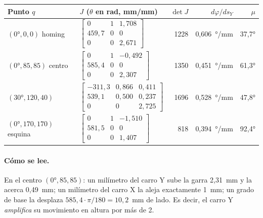 \begin{center}\small
\begin{longtable}{>{\raggedright}p{3cm} >{\centering}p{6.3cm} r r r}
\toprule
\textbf{Punto $q$} & \textbf{$J$ ($\theta$ en rad, mm/mm)} & \textbf{$\det J$} & \textbf{$d\varphi/ds_Y$} & \textbf{$\mu$}\\
\midrule
\endhead
$(0°, 0, 0)$ homing & $\begin{bmatrix}0 & 1 & 1{,}708\\ 459{,}7 & 0 & 0\\ 0 & 0 & 2{,}671\end{bmatrix}$ & 1228 & 0,606~°/mm & 37,7°\\[14pt]
$(0°, 85, 85)$ centro & $\begin{bmatrix}0 & 1 & -0{,}492\\ 585{,}4 & 0 & 0\\ 0 & 0 & 2{,}307\end{bmatrix}$ & 1350 & 0,451~°/mm & 61,3°\\[14pt]
$(30°, 120, 40)$ & $\begin{bmatrix}-311{,}3 & 0{,}866 & 0{,}411\\ 539{,}1 & 0{,}500 & 0{,}237\\ 0 & 0 & 2{,}725\end{bmatrix}$ & 1696 & 0,528~°/mm & 47,8°\\[14pt]
$(0°, 170, 170)$ esquina & $\begin{bmatrix}0 & 1 & -1{,}510\\ 581{,}5 & 0 & 0\\ 0 & 0 & 1{,}407\end{bmatrix}$ & 818 & 0,394~°/mm & 92,4°\\
\bottomrule
\end{longtable}
\end{center}

\paragraph{Cómo se lee.} En el centro $(0°, 85, 85)$: un milímetro del carro Y sube la garra 2,31~mm y la acerca 0,49~mm; un milímetro del carro X la aleja exactamente 1~mm; un grado de base la desplaza $585{,}4 \cdot \pi/180 = 10{,}2$~mm de lado. Es decir, el carro Y \emph{amplifica} su movimiento en altura por más de 2.

